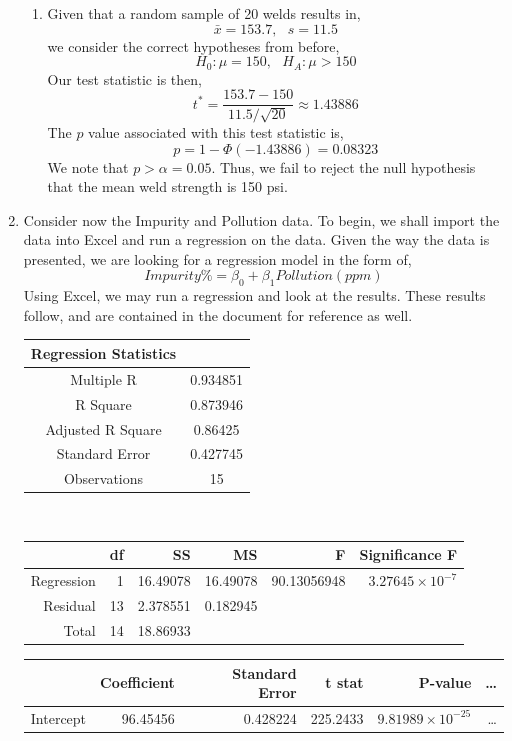 \documentclass[letterpaper,10pt]{article}
\begin{document}
\begin{enumerate}
\begin{enumerate}
\item Given that a random sample of 20 welds results in,
\[\bar{x}=153.7,\ \ \ s=11.5\]
we consider the correct hypotheses from before,
\[H_0: \mu=150,\ \ \ H_A: \mu >150\]
Our test statistic is then,
\[t^*=\frac{153.7-150}{11.5/\sqrt{20}}\approx 1.43886\]
The $p$ value associated with this test statistic is,
\[p=1-\Phi(-1.43886)=0.08323\]
We note that $p>\alpha=0.05$. Thus, we fail to reject the null hypothesis that the mean weld strength is 150 psi.
\end{enumerate}
\item Consider now the Impurity and Pollution data. To begin, we shall import the data into Excel and run a regression on the data. Given the way the data is presented, we are looking for a regression model in the form of,
\[Impurity\%=\beta_0+\beta_1Pollution(ppm)\]
Using Excel, we may run a regression and look at the results. These results follow, and are contained in the document for reference as well.
\begin{center}
\begin{tabular}{c|c}
\hline
Regression Statistics & \\\hline
Multiple R & 0.934851\\
R Square & 0.873946\\
Adjusted R Square & 0.86425\\
Standard Error & 0.427745\\
Observations & 15\\\hline
\end{tabular}\\
\end{center}
\begin{center}
\begin{tabular}{r|r|r|r|r|r}
\hline
& df & SS & MS & F & Significance F\\\hline
Regression & 1 & 16.49078 & 16.49078 & 90.13056948 & $3.27645\times 10^{-7}$\\
Residual & 13 & 2.378551 & 0.182945 &&\\
Total & 14 & 18.86933\\\hline
\end{tabular}
\end{center}
\begin{center}
\begin{tabular}{rrrrrr}
\hline
& Coefficient & Standard Error & t stat & P-value & \ldots\\\hline
Intercept & 96.45456 & 0.428224 & 225.2433 & $9.81989\times10^{-25}$ & \ldots\\

\end{tabular}
\end{center}
\end{enumerate}
\end{document}
